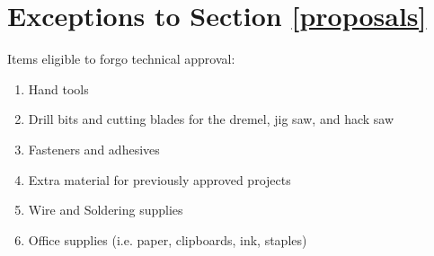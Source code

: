 \section{Exceptions to Section \ref{proposals}}
\label{allowed_items}
Items eligible to forgo technical approval:
\begin{enumerate}
\item Hand tools
\item Drill bits and cutting blades for the dremel, jig saw, and hack saw
\item Fasteners and adhesives
\item Extra material for previously approved projects
\item Wire and Soldering supplies
\item Office supplies (i.e. paper, clipboards, ink, staples)
\end{enumerate}